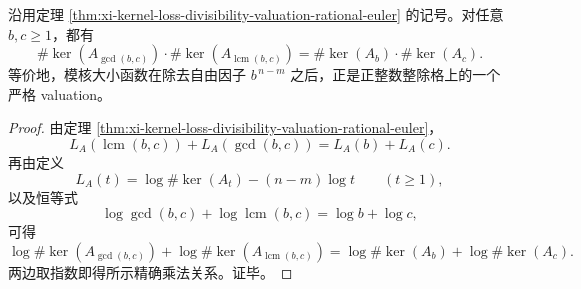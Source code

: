\begin{corollary}[模核大小在整除格上满足精确乘法恒等式]\label{cor:xi-kernel-size-gcd-lcm-exact-multiplicativity}
沿用定理 \ref{thm:xi-kernel-loss-divisibility-valuation-rational-euler} 的记号。对任意 \(b,c\ge 1\)，都有
\[
\#\ker(A_{\gcd(b,c)})\cdot \#\ker(A_{\operatorname{lcm}(b,c)})
=
\#\ker(A_b)\cdot \#\ker(A_c).
\]
等价地，模核大小函数在除去自由因子 \(b^{\,n-m}\) 之后，正是正整数整除格上的一个严格 valuation。
\end{corollary}
\begin{proof}
由定理 \ref{thm:xi-kernel-loss-divisibility-valuation-rational-euler}，
\[
L_A(\operatorname{lcm}(b,c))+L_A(\gcd(b,c))=L_A(b)+L_A(c).
\]
再由定义
\[
L_A(t)=\log\#\ker(A_t)-(n-m)\log t
\qquad(t\ge 1),
\]
以及恒等式
\[
\log\gcd(b,c)+\log\operatorname{lcm}(b,c)=\log b+\log c,
\]
可得
\[
\log\#\ker(A_{\gcd(b,c)})+\log\#\ker(A_{\operatorname{lcm}(b,c)})
=
\log\#\ker(A_b)+\log\#\ker(A_c).
\]
两边取指数即得所示精确乘法关系。证毕。
\end{proof}


